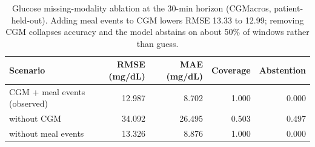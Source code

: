 \begin{table}[t]
\centering
\caption{Glucose missing-modality ablation at the 30-min horizon (CGMacros, patient-held-out). Adding meal events to CGM lowers RMSE 13.33 to 12.99; removing CGM collapses accuracy and the model abstains on about 50\% of windows rather than guess.}
\label{tab:glucose_ablation}
\begin{tabular}{lrrrr}
\toprule
Scenario & RMSE (mg/dL) & MAE (mg/dL) & Coverage & Abstention \\
\midrule
CGM + meal events (observed) & 12.987 & 8.702 & 1.000 & 0.000 \\
without CGM & 34.092 & 26.495 & 0.503 & 0.497 \\
without meal events & 13.326 & 8.876 & 1.000 & 0.000 \\
\bottomrule
\end{tabular}
\end{table}
